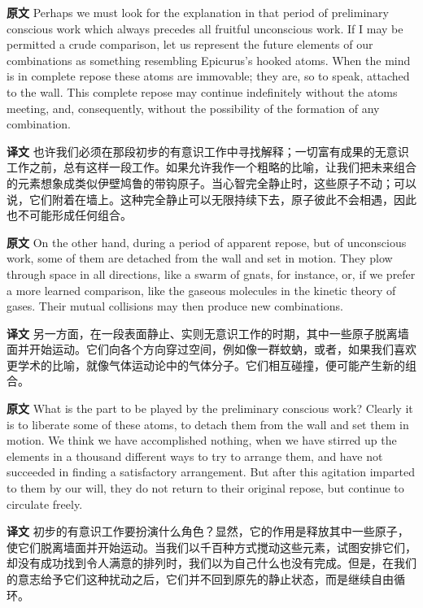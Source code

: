 \documentclass[UTF8]{ctexart}
\newenvironment{english}{\par\small\noindent\textbf{原文}\quad\ignorespaces}{\par}
\newenvironment{zhtranslation}{\par\noindent\textbf{译文}\quad\ignorespaces}{\par\vspace{0.35em}}
\begin{document}
\begin{english}
Perhaps we must look for the explanation in that period of preliminary conscious work which always precedes all fruitful unconscious work. If I may be permitted a crude comparison, let us represent the future elements of our combinations as something resembling Epicurus's hooked atoms. When the mind is in complete repose these atoms are immovable; they are, so to speak, attached to the wall. This complete repose may continue indefinitely without the atoms meeting, and, consequently, without the possibility of the formation of any combination.
\end{english}
\begin{zhtranslation}
也许我们必须在那段初步的有意识工作中寻找解释；一切富有成果的无意识工作之前，总有这样一段工作。如果允许我作一个粗略的比喻，让我们把未来组合的元素想象成类似伊壁鸠鲁的带钩原子。当心智完全静止时，这些原子不动；可以说，它们附着在墙上。这种完全静止可以无限持续下去，原子彼此不会相遇，因此也不可能形成任何组合。\end{zhtranslation}

\begin{english}
On the other hand, during a period of apparent repose, but of unconscious work, some of them are detached from the wall and set in motion. They plow through space in all directions, like a swarm of gnats, for instance, or, if we prefer a more learned comparison, like the gaseous molecules in the kinetic theory of gases. Their mutual collisions may then produce new combinations.
\end{english}
\begin{zhtranslation}
另一方面，在一段表面静止、实则无意识工作的时期，其中一些原子脱离墙面并开始运动。它们向各个方向穿过空间，例如像一群蚊蚋，或者，如果我们喜欢更学术的比喻，就像气体运动论中的气体分子。它们相互碰撞，便可能产生新的组合。\end{zhtranslation}

\begin{english}
What is the part to be played by the preliminary conscious work? Clearly it is to liberate some of these atoms, to detach them from the wall and set them in motion. We think we have accomplished nothing, when we have stirred up the elements in a thousand different ways to try to arrange them, and have not succeeded in finding a satisfactory arrangement. But after this agitation imparted to them by our will, they do not return to their original repose, but continue to circulate freely.
\end{english}
\begin{zhtranslation}
初步的有意识工作要扮演什么角色？显然，它的作用是释放其中一些原子，使它们脱离墙面并开始运动。当我们以千百种方式搅动这些元素，试图安排它们，却没有成功找到令人满意的排列时，我们以为自己什么也没有完成。但是，在我们的意志给予它们这种扰动之后，它们并不回到原先的静止状态，而是继续自由循环。\end{zhtranslation}
\end{document}
